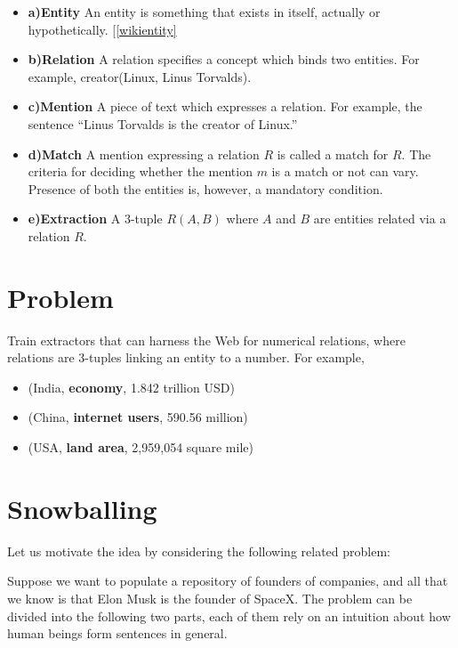 \documentclass[a4paper,10pt]{article}
\begin{document}
\begin{itemize}

\item \textbf{a)Entity}
An entity is something that exists in itself, actually or hypothetically. [\ref{wikientity}

\item \textbf{b)Relation}
A relation specifies a concept which binds two entities. For example, creator(Linux, Linus Torvalds).

\item \textbf{c)Mention}
 A piece of text which expresses a relation. For example, the sentence ``Linus Torvalds is the creator of Linux.''

\item \textbf{d)Match}
A mention expressing a relation $R$ is called a match for $R$. The criteria for deciding whether the mention $m$ is a match or not 
can vary. Presence of both the entities is, however, a mandatory condition.

\item \textbf{e)Extraction}
A 3-tuple $R(A, B)$ where $A$ and $B$ are entities related via a relation $R$.
\end{itemize}

\section{Problem}
Train extractors that can harness the Web for numerical relations, where relations are 3-tuples linking an entity
to a number. For example,
    \begin{itemize}
	\item  (India, \textbf{economy}, 1.842 trillion USD)
	\item  (China, \textbf{internet users},  590.56 million)
	\item  (USA, \textbf{land area}, 2,959,054 square mile)
    \end{itemize}

\section{Snowballing}
Let us motivate the idea by considering the following related problem:

Suppose we want to populate a repository of founders of companies, and all that we know
is that Elon Musk is the founder of SpaceX.
The problem can be divided into the following two parts, each of them rely on an intuition about how human 
beings form sentences in general.
\end{document}
